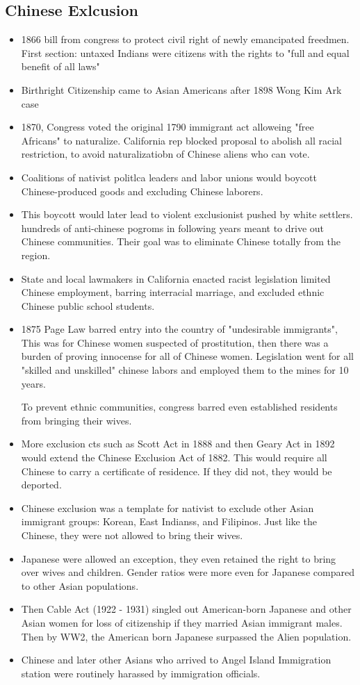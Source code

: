 \documentclass{article}
\begin{document}
\subsection{Chinese Exlcusion}
\begin{itemize}
  \item 1866 bill from congress to protect civil right of newly emancipated freedmen.
    First section: untaxed Indians were citizens with the rights to "full and equal benefit of all laws"
  \item Birthright Citizenship came to Asian Americans after 1898 Wong Kim Ark case
  \item 1870, Congress voted the original 1790 immigrant act alloweing "free Africans" to naturalize.
    California rep blocked proposal to abolish all racial restriction,
    to avoid naturalizatiobn of Chinese aliens who can vote.
  \item Coalitions of nativist politlca leaders and labor unions would boycott Chinese-produced goods
    and excluding Chinese laborers.
  \item This boycott would later lead to violent exclusionist pushed by white settlers.
    hundreds of anti-chinese pogroms in following years meant to drive out Chinese communities.
    Their goal was to eliminate Chinese totally from the region.
  \item State and local lawmakers in California enacted racist legislation limited Chinese employment,
    barring interracial marriage, and excluded ethnic Chinese public school students.
  \item 1875 Page Law barred entry into the country of "undesirable immigrants",
    This was for Chinese women suspected of prostitution, then there was a burden of proving innocense for all
    of Chinese women. Legislation went for all "skilled and unskilled" chinese labors and employed them
    to the mines for 10 years.

    To prevent ethnic communities, congress barred even established residents from bringing their wives.
  \item More exclusion cts such as Scott Act in 1888 and then Geary Act in 1892
    would extend the Chinese Exclusion Act of 1882.
    This would require all Chinese to carry a certificate of residence.
    If they did not, they would be deported.
  \item Chinese exclusion was a template for nativist to exclude other Asian immigrant groups: Korean,
    East Indianss, and Filipinos. Just like the Chinese, they were not allowed
    to bring their wives.
  \item Japanese were allowed an exception, they even retained the right to bring over wives and children.
    Gender ratios were more even for Japanese compared to other Asian populations.
  \item Then Cable Act (1922 - 1931) singled out American-born Japanese and other Asian women for loss of citizenship
    if they married Asian immigrant males. Then by WW2, the American born Japanese surpassed the Alien population.
  \item Chinese and later other Asians who arrived to Angel Island Immigration station were routinely harassed by immigration officials.
\end{itemize}
\end{document}
